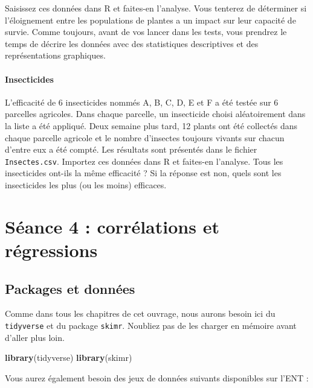 \documentclass[a4paperpaper,]{article}
\newenvironment{Shaded}{\begin{snugshade}}{\end{snugshade}}
\newcommand{\KeywordTok}[1]{\textcolor[rgb]{0.12,0.11,0.11}{\textbf{#1}}}
\newcommand{\NormalTok}[1]{\textcolor[rgb]{0.12,0.11,0.11}{#1}}
\let\oldparagraph\paragraph
\renewcommand{\paragraph}[1]{\oldparagraph{#1}\mbox{}}
\begin{document}
Saisissez ces données dans R et faites-en l'analyse. Vous tenterez de déterminer si l'éloignement entre les populations de plantes a un impact sur leur capacité de survie. Comme toujours, avant de vos lancer dans les tests, vous prendrez le temps de décrire les données avec des statistiques descriptives et des représentations graphiques.

\hypertarget{insecticides}{%
\paragraph{Insecticides}\label{insecticides}}

L'efficacité de 6 insecticides nommés A, B, C, D, E et F a été testée sur 6 parcelles agricoles. Dans chaque parcelle, un insecticide choisi aléatoirement dans la liste a été appliqué. Deux semaine plus tard, 12 plants ont été collectés dans chaque parcelle agricole et le nombre d'insectes toujours vivants sur chacun d'entre eux a été compté. Les résultats sont présentés dans le fichier \texttt{Insectes.csv}. Importez ces données dans R et faites-en l'analyse. Tous les insecticides ont-ils la même efficacité ? Si la réponse est non, quels sont les insecticides les plus (ou les moins) efficaces.

\hypertarget{seance-4-correlations-et-regressions}{%
\section{Séance 4 : corrélations et régressions}\label{seance-4-correlations-et-regressions}}

\hypertarget{packages-et-donnees-1}{%
\subsection{Packages et données}\label{packages-et-donnees-1}}

Comme dans tous les chapitres de cet ouvrage, nous aurons besoin ici du \texttt{tidyverse} et du package \texttt{skimr}. Noubliez pas de les charger en mémoire avant d'aller plus loin.

\begin{Shaded}
\begin{Highlighting}[]
\KeywordTok{library}\NormalTok{(tidyverse)}
\KeywordTok{library}\NormalTok{(skimr)}
\end{Highlighting}
\end{Shaded}

Vous aurez également besoin des jeux de données suivants disponibles sur l'ENT :
\end{document}
